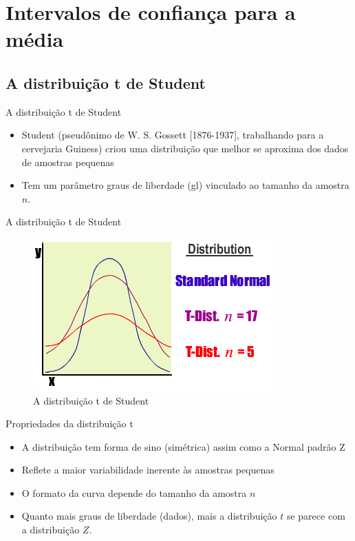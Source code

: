 \documentclass{beamer}
\begin{document}
\section{Intervalos de confiança para a média}

\subsection{A distribuição t de Student}

\begin{frame}{A distribuição t de Student}
  \begin{itemize}
  \item Student (pseudônimo de W. S. Gossett [1876-1937], trabalhando
    para a cervejaria Guiness) criou uma distribuição que melhor se
    aproxima dos dados de amostras pequenas
  \item Tem um parâmetro \alert{graus de liberdade} (gl) vinculado ao
    tamanho da amostra $n$.
  \end{itemize}
\end{frame}

\begin{frame}{A distribuição t de Student}
  \begin{figure}
    \includegraphics[height=0.7\textheight]{Inf_II/t_graph}
    \caption{A distribuição t de Student}
  \end{figure}
\end{frame}

\begin{frame}{Propriedades da distribuição t}
  \begin{itemize}
  \item A distribuição tem forma de sino (simétrica) assim como a
    Normal padrão Z
  \item Reflete a maior variabilidade inerente às amostras pequenas
  \item O formato da curva depende do tamanho da amostra $n$
  \item Quanto mais graus de liberdade (dados), mais a distribuição
    $t$ se parece com a distribuição $Z$.
  \end{itemize}
\end{frame}
\end{document}
